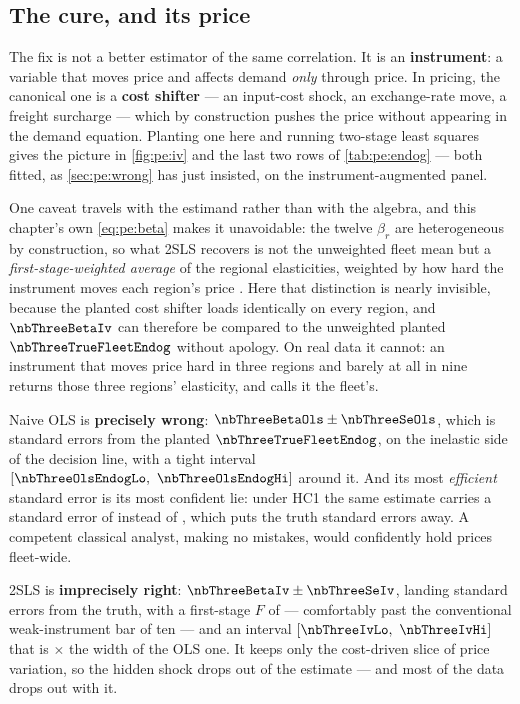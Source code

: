 \subsection*{The cure, and its price}



The fix is not a better estimator of the same correlation. It is an \textbf{instrument}: a variable
that moves price and affects demand \emph{only} through price. In pricing, the canonical one is a
\textbf{cost shifter} --- an input-cost shock, an exchange-rate move, a freight surcharge --- which
by construction pushes the price without appearing in the demand equation. Planting one here and
running two-stage least squares \citep{angrist2009} gives the picture in \cref{fig:pe:iv} and the
last two rows of \cref{tab:pe:endog} --- both fitted, as \cref{sec:pe:wrong} has just insisted, on
the instrument-augmented panel.

One caveat travels with the estimand rather than with the algebra, and this chapter's own
\cref{eq:pe:beta} makes it unavoidable: the twelve $\beta_r$ are heterogeneous by construction, so
what 2SLS recovers is not the unweighted fleet mean but a \emph{first-stage-weighted average} of the
regional elasticities, weighted by how hard the instrument moves each region's price
\citep{imbens1994}. Here that distinction is nearly invisible, because the planted cost shifter loads
identically on every region, and $\nbThreeBetaIv$ can therefore be compared to the unweighted planted
$\nbThreeTrueFleetEndog$ without apology. On real data it cannot: an instrument that moves price
hard in three regions and barely at all in nine returns those three regions' elasticity, and calls it
the fleet's.

Naive OLS is \textbf{precisely wrong}: $\nbThreeBetaOls \pm \nbThreeSeOls$, which is
\nbThreeOlsSesOff{} standard errors from the planted $\nbThreeTrueFleetEndog$, on the inelastic side
of the decision line, with a tight interval $[\nbThreeOlsEndogLo,\ \nbThreeOlsEndogHi]$ around it.
And its most \emph{efficient} standard error is its most confident lie: under HC1 the same estimate
carries a standard error of \nbThreeOlsSeHc{} instead of \nbThreeSeOls, which puts the truth
\nbThreeOlsSesOffHc{} standard errors away. A competent classical analyst, making no mistakes, would
confidently hold prices fleet-wide.

2SLS is \textbf{imprecisely right}: $\nbThreeBetaIv \pm \nbThreeSeIv$, landing
\nbThreeIvSesOff{} standard errors from the truth, with a first-stage $F$ of \nbThreeIvF{} ---
comfortably past the conventional weak-instrument bar of ten \citep{stock2005} --- and an interval
$[\nbThreeIvLo,\ \nbThreeIvHi]$ that is \nbThreeIvWidthRatio$\times$ the width of the OLS one. It
keeps only the cost-driven slice of price variation, so the hidden shock drops out of the
estimate --- and most of the data drops out with it.

